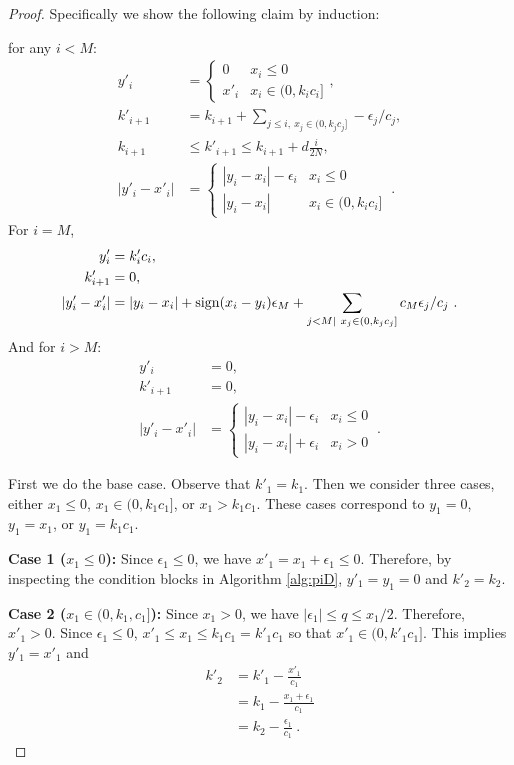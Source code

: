 \documentclass[12pt]{colt2018} %
\begin{document}
\begin{proof}
Specifically we show the following claim by induction:
\begin{Claim}
for any $i<M$:
\begin{align*}
y'_i &= \left\{\begin{array}{lr}
0&x_i\le 0\\
x'_i&x_i\in (0,k_ic_i]
\end{array}\right.,\\
k'_{i+1}&= k_{i+1}+\sum_{j\le i,\ x_j\in(0,k_jc_j]} -\epsilon_j/c_j,\\
k_{i+1}&\le k'_{i+1}\le k_{i+1} + d\frac{i}{2N},\\
|y'_i-x'_i|&=\left\{\begin{array}{lr}
|y_i-x_i|-\epsilon_i&x_i\le 0\\
|y_i-x_i|&x_i\in (0,k_ic_i]
\end{array}
\right.~.
\end{align*}
For $i=M$,
\begin{align*}
y'_i &= k'_ic_i,\\
k'_{i+1}&=0,\\
|y'_i-x'_i| &= |y_i-x_i|+\sign(x_i-y_i)\epsilon_M+\sum_{j<M|\ x_j\in(0,k_jc_j]} c_M\epsilon_j/c_j~.
\end{align*}
And for $i>M$:
\begin{align*}
y'_i &= 0,\\
k'_{i+1}&=0,\\
|y'_i-x'_i| &= \left\{\begin{array}{lr}
|y_i-x_i|-\epsilon_i&x_i\le 0\\
|y_i-x_i|+\epsilon_i& x_i>0
\end{array}
\right.~.
\end{align*}
\end{Claim}

First we do the base case. Observe that $k'_1=k_1$. Then we consider three cases, either $x_1\le 0$, $x_1\in (0,k_1c_1]$, or $x_1> k_1c_1$. These cases correspond to $y_1=0$, $y_1=x_1$, or $y_1=k_1c_1$.

\textbf{Case 1 ($x_1\le 0$):} Since $\epsilon_1\le 0$, we have $x'_1=x_1+\epsilon_1\le 0$. Therefore, by inspecting the condition blocks in Algorithm \ref{alg:piD}, $y'_1 = y_1 = 0$ and $k'_2=k_2$.

\textbf{Case 2 ($x_1\in (0,k_1,c_1]$):} Since $x_1>0$, we have $|\epsilon_1|\le q\le x_1/2$. Therefore, $x'_1>0$. Since $\epsilon_1\le 0$, $x'_1\le x_1\le k_1c_1=k'_1c_1$ so that $x'_1\in(0,k'_1c_1]$. This implies $y'_1= x'_1$ and 
\begin{align*}
k'_2&=k'_1-\frac{x'_1}{c_1}\\
&=k_1-\frac{x_1+\epsilon_1}{c_1}\\
&=k_2-\frac{\epsilon_1}{c_1}~.
\end{align*}


\end{proof}
\end{document}
